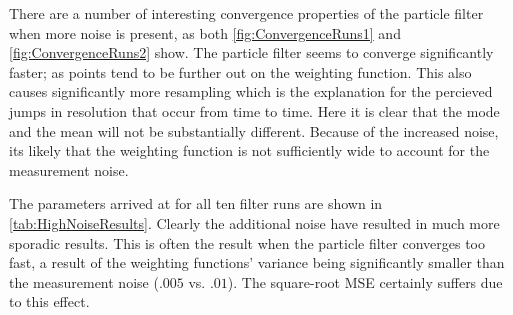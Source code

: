 There are a number of interesting convergence properties of the
particle filter when more noise is present, as both \autoref{fig:ConvergenceRuns1} and
\autoref{fig:ConvergenceRuns2} show. The particle filter seems to converge
significantly faster; as points tend to be further out on the weighting function. This
also causes significantly more resampling which is the explanation for the percieved
jumps in resolution that occur from time to time. Here it is clear that the mode and
the mean will not be substantially different. Because of the increased noise, its likely
that the weighting function is not sufficiently wide to account for the measurement noise.

The parameters arrived at for all ten filter runs are shown in \autoref{tab:HighNoiseResults}.
Clearly the additional noise have resulted in much more sporadic results. This is often the 
result when the particle filter converges too fast, a result of the weighting functions' variance
being significantly smaller than the measurement noise ($.005$ vs. $.01$). The square-root
MSE certainly suffers due to this effect.

